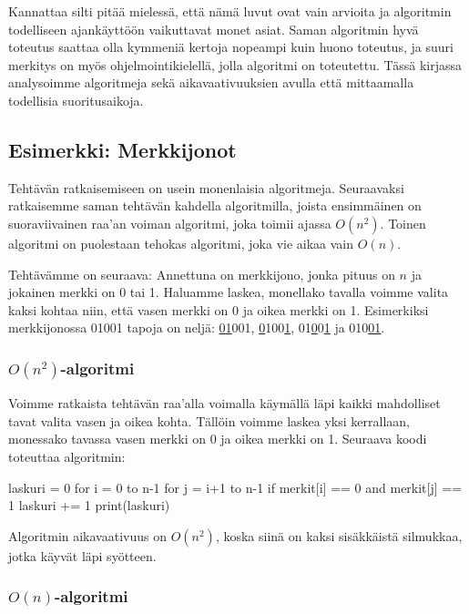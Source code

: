 Kannattaa silti pitää mielessä, että nämä luvut ovat vain arvioita ja algoritmin
todelliseen ajankäyttöön vaikuttavat monet asiat.
Saman algoritmin hyvä toteutus saattaa olla
kymmeniä kertoja nopeampi kuin huono toteutus,
ja suuri merkitys on myös ohjelmointikielellä,
jolla algoritmi on toteutettu.
Tässä kirjassa analysoimme algoritmeja sekä aikavaativuuksien
avulla että mittaamalla todellisia suoritusaikoja.

\subsection{Esimerkki: Merkkijonot}

Tehtävän ratkaisemiseen on usein monenlaisia algoritmeja.
Seuraavaksi ratkaisemme saman tehtävän kahdella algoritmilla,
joista ensimmäinen on suoraviivainen raa'an voiman
algoritmi, joka toimii ajassa $O(n^2)$.
Toinen algoritmi on puolestaan tehokas algoritmi,
joka vie aikaa vain $O(n)$.

Tehtävämme on seuraava: Annettuna on merkkijono,
jonka pituus on $n$ ja jokainen merkki on 0 tai 1.
Haluamme laskea, monellako tavalla voimme valita kaksi kohtaa
niin, että vasen merkki on 0 ja oikea merkki on 1.
Esimerkiksi merkkijonossa 01001 tapoja on neljä:
\underline{01}001, \underline{0}100\underline{1},
01\underline{0}0\underline{1} ja 010\underline{01}.

\subsubsection{$O(n^2)$-algoritmi}

Voimme ratkaista tehtävän raa'alla voimalla
käymällä läpi kaikki mahdolliset tavat valita vasen ja oikea kohta.
Tällöin voimme laskea yksi kerrallaan,
monessako tavassa vasen merkki on 0 ja oikea merkki on 1.
Seuraava koodi toteuttaa algoritmin:

\begin{code}
    laskuri = 0
    for i = 0 to n-1
    for j = i+1 to n-1
    if merkit[i] == 0 and merkit[j] == 1
    laskuri += 1
    print(laskuri)
\end{code}

Algoritmin aikavaativuus on $O(n^2)$, koska siinä on kaksi
sisäkkäistä silmukkaa, jotka käyvät läpi syötteen.

\subsubsection{$O(n)$-algoritmi}

